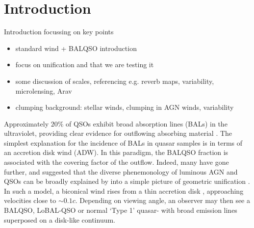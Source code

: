 \documentclass[useAMS,usenatbib]{mn2e_x}
\begin{document}



%
%
\section{Introduction}

Introduction focussing on key points

\begin{itemize}
\item standard wind + BALQSO introduction
\item focus on unification and that we are testing it
\item some discussion of scales, referencing e.g. reverb maps, variability, microlensing, Arav 
\item clumping background: stellar winds, clumping in AGN winds, variability
\end{itemize}

Approximately $20\%$ of QSOs exhibit broad absorption lines (BALs) in the ultraviolet,
providing clear evidence for outflowing absorbing material
\citep{weymann1991, knigge2008, turnermiller2009,allen2011}.
The simplest explanation for the incidence of 
BALs in quasar samples is in terms of an accretion disk wind (ADW). 
In this paradigm, the BALQSO fraction is associated with
the covering factor of the outflow.
Indeed, many have gone further, and suggested that the diverse phenemonology
of luminous AGN and QSOs can be broadly explained by
into a simple picture of geometric unification \citep[e.g.]{MCGV95, elvis2000}. 
In such a model, a biconical wind rises from 
a thin accretion disk \cite{shakurasunyaev1973}, approaching velocities
close to $\sim0.1c$. Depending on viewing angle, an observer 
may then see a BALQSO, LoBAL-QSO or normal `Type 1' quasar- with 
broad emission lines superposed on a disk-like continuum. 
\end{document}
